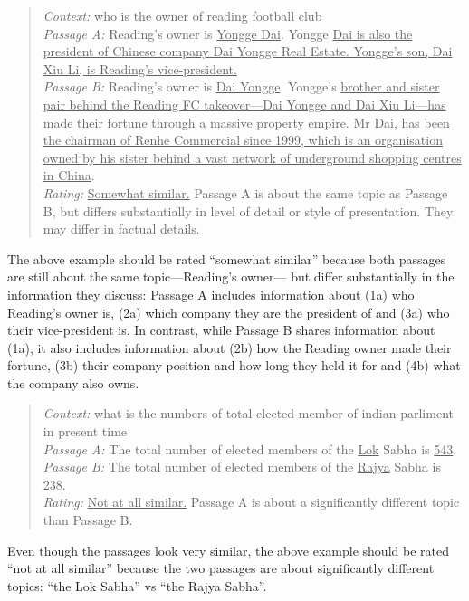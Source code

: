 \begin{quote}
\textit{Context:}
who is the owner of reading football club \\
\textit{Passage A:}
Reading's owner is \ul{Yongge Dai}. Yongge \ul{Dai is also the president of Chinese company Dai Yongge Real Estate. Yongge's son, Dai Xiu Li, is Reading's vice-president.} \\
\textit{Passage B:}
Reading's owner is \ul{Dai Yongge}. Yongge's \ul{brother and sister pair behind the Reading FC takeover---Dai Yongge and Dai Xiu Li---has made their fortune through a massive property empire. Mr Dai, has been the chairman of Renhe Commercial since 1999, which is an organisation owned by his sister behind a vast network of underground shopping centres in China}. \\
\textit{Rating:}
\ul{Somewhat similar.} Passage A is about the same topic as Passage B, but differs substantially in level of detail or style of presentation. They may differ in factual details.
\end{quote}

The above example should be rated ``somewhat similar'' because both passages are still about the same topic—Reading's owner— but differ substantially in the information they discuss: Passage A includes information about (1a) who Reading's owner is, (2a) which company they are the president of and (3a) who their vice-president is. In contrast, while Passage B shares information about (1a), it also includes information about (2b) how the Reading owner made their fortune, (3b) their company position and how long they held it for and (4b) what the company also owns.


\begin{quote}
\textit{Context:}
what is the numbers of total elected member of indian parliment in present time \\
\textit{Passage A:}
The total number of elected members of the \ul{Lok} Sabha is \ul{543}. \\
\textit{Passage B:}
The total number of elected members of the \ul{Rajya} Sabha is \ul{238}. \\
\textit{Rating:}
\ul{Not at all similar.} Passage A is about a significantly different topic than Passage B.
\end{quote}

Even though the passages look very similar, the above example should be rated ``not at all similar'' because the two passages are about significantly different topics: ``the Lok Sabha'' vs ``the Rajya Sabha''.
